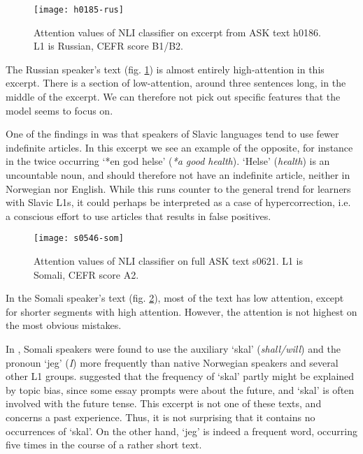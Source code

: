 \begin{figure}
  \centering
  \texttt{[image: h0185-rus]}
  \caption[Attention heat map in a text by a Russian speaker]{
    Attention values of NLI classifier on excerpt from ASK text h0186. L1 is
    Russian, CEFR score B1/B2.
  }
  \label{fig:rus-attention}
\end{figure}

The Russian speaker's text (fig. \ref{fig:rus-attention}) is almost entirely
high-attention in this excerpt. There is a section of low-attention, around
three sentences long, in the middle of the excerpt. We can therefore not pick
out specific features that the model seems to focus on.

One of the findings in \textcite{pepper2012} was that speakers of Slavic
languages tend to use fewer indefinite articles. In this excerpt we see an
example of the opposite, for instance in the twice occurring `*en god helse'
(\emph{*a good health}). `Helse' (\emph{{health}}) is an uncountable noun,
and should therefore not have an indefinite article, neither in Norwegian nor
English. While this runs counter to the general trend for learners with
Slavic \acp{L1}, it could perhaps be interpreted as a case of
hypercorrection, i.e. a conscious effort to use articles that results in
false positives.

\begin{figure}
  \centering
  \texttt{[image: s0546-som]}
  \caption[Attention heat map in a text by a Somali speaker]{
    Attention values of NLI classifier on full ASK text s0621. L1 is Somali,
    CEFR score A2.
  }
  \label{fig:som-attention}
\end{figure}

In the Somali speaker's text (fig. \ref{fig:som-attention}), most of the text
has low attention, except for shorter segments with high attention. However,
the attention is not highest on the most obvious mistakes.

In \textcite{pepper2012}, Somali speakers were found to use the auxiliary
`skal' (\emph{shall/will}) and the pronoun `jeg' (\emph{I}) more frequently
than native Norwegian speakers and several other L1 groups.
\citeauthor{pepper2012} suggested that the frequency of `skal' partly might
be explained by topic bias, since some essay prompts were about the future,
and `skal' is often involved with the future tense. This excerpt is not one of
these texts, and concerns a past experience. Thus, it is not surprising that
it contains no occurrences of `skal'. On the other hand, `jeg' is indeed a
frequent word, occurring five times in the course of a rather short text.

